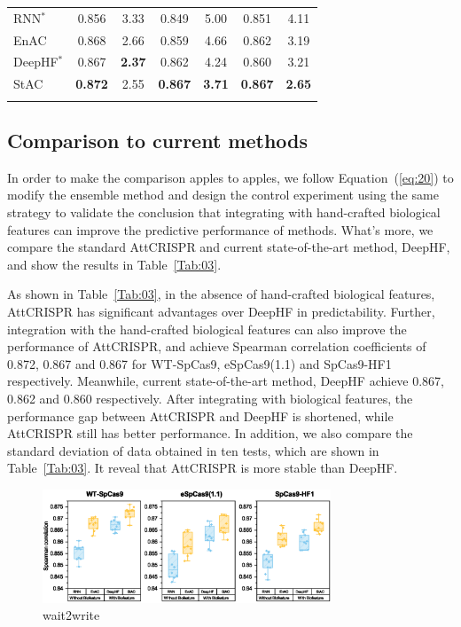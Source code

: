\documentclass{bioinfo}
\begin{document}
\begin{table}[!tpb]
{\begin{tabular}{lcccccc}
        RNN$^*$ & 0.856 & 3.33 & 0.849 & 5.00 & 0.851 & 4.11 \\
        EnAC   & 0.868 & 2.66 & 0.859 & 4.66 & 0.862 & 3.19 \\
        DeepHF$^*$ & 0.867 & \textbf{2.37} & 0.862 & 4.24 & 0.860 & 3.21 \\
        StAC   & \textbf{0.872} & 2.55 & \textbf{0.867} & \textbf{3.71} & \textbf{0.867} & \textbf{2.65} \\
     \botrule
\end{tabular}}\footnotesize{}
\end{table}

\subsection{Comparison to current methods}\label{section:comparison}

In order to make the comparison apples to apples, 
we follow Equation~(\ref{eq:20}) to modify the ensemble method and design the control experiment using the same strategy to validate the conclusion that integrating with hand-crafted biological features can improve the predictive performance of methods. 
What's more, we compare the standard AttCRISPR and current state-of-the-art method, DeepHF, and show the results in Table~\ref{Tab:03}. 

As shown in Table~\ref{Tab:03}, in the absence of hand-crafted biological features, AttCRISPR has significant advantages over DeepHF in predictability. 
Further, integration with the hand-crafted biological features can also improve the performance of AttCRISPR, and achieve Spearman correlation coefficients of 0.872, 0.867 and 0.867 for WT-SpCas9, eSpCas9(1.1) and SpCas9-HF1 respectively. Meanwhile, current state-of-the-art method, DeepHF achieve 0.867, 0.862 and 0.860 respectively. 
After integrating with biological features, the performance gap between AttCRISPR and DeepHF is shortened, while AttCRISPR still has better performance. In addition, we also compare the standard deviation of data obtained in ten tests, which are shown in Table~\ref{Tab:03}. 
It reveal that AttCRISPR is more stable than DeepHF.

\begin{figure}[!tpb]%
    \centerline{\includegraphics[width=86mm]{baselinewithbiofeat.eps}}
    \caption{wait2write}\label{fig:07}
\end{figure}
\end{document}
